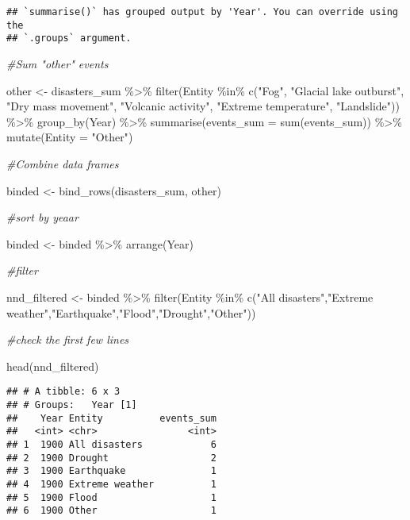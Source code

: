 \documentclass[
]{article}
\newenvironment{Shaded}{\begin{snugshade}}{\end{snugshade}}
\newcommand{\AttributeTok}[1]{\textcolor[rgb]{0.77,0.63,0.00}{#1}}
\newcommand{\CommentTok}[1]{\textcolor[rgb]{0.56,0.35,0.01}{\textit{#1}}}
\newcommand{\FunctionTok}[1]{\textcolor[rgb]{0.00,0.00,0.00}{#1}}
\newcommand{\NormalTok}[1]{#1}
\newcommand{\OtherTok}[1]{\textcolor[rgb]{0.56,0.35,0.01}{#1}}
\newcommand{\SpecialCharTok}[1]{\textcolor[rgb]{0.00,0.00,0.00}{#1}}
\newcommand{\StringTok}[1]{\textcolor[rgb]{0.31,0.60,0.02}{#1}}
\begin{document}
\begin{verbatim}
## `summarise()` has grouped output by 'Year'. You can override using the
## `.groups` argument.
\end{verbatim}

\begin{Shaded}
\begin{Highlighting}[]
\CommentTok{\#Sum "other" events }

\NormalTok{other }\OtherTok{\textless{}{-}}\NormalTok{ disasters\_sum }\SpecialCharTok{\%\textgreater{}\%}
  \FunctionTok{filter}\NormalTok{(Entity }\SpecialCharTok{\%in\%} \FunctionTok{c}\NormalTok{(}\StringTok{"Fog"}\NormalTok{, }\StringTok{"Glacial lake outburst"}\NormalTok{, }\StringTok{"Dry mass movement"}\NormalTok{, }\StringTok{"Volcanic activity"}\NormalTok{, }\StringTok{"Extreme temperature"}\NormalTok{, }\StringTok{"Landslide"}\NormalTok{)) }\SpecialCharTok{\%\textgreater{}\%} 
  \FunctionTok{group\_by}\NormalTok{(Year) }\SpecialCharTok{\%\textgreater{}\%}
  \FunctionTok{summarise}\NormalTok{(}\AttributeTok{events\_sum =} \FunctionTok{sum}\NormalTok{(events\_sum)) }\SpecialCharTok{\%\textgreater{}\%} 
  \FunctionTok{mutate}\NormalTok{(}\AttributeTok{Entity =} \StringTok{"Other"}\NormalTok{)}

\CommentTok{\#Combine data frames}

\NormalTok{binded }\OtherTok{\textless{}{-}} \FunctionTok{bind\_rows}\NormalTok{(disasters\_sum, other)}

\CommentTok{\#sort by yeaar}

\NormalTok{binded }\OtherTok{\textless{}{-}}\NormalTok{ binded }\SpecialCharTok{\%\textgreater{}\%} 
  \FunctionTok{arrange}\NormalTok{(Year)}

\CommentTok{\#filter}

\NormalTok{nnd\_filtered }\OtherTok{\textless{}{-}}\NormalTok{ binded }\SpecialCharTok{\%\textgreater{}\%} 
  \FunctionTok{filter}\NormalTok{(Entity }\SpecialCharTok{\%in\%} \FunctionTok{c}\NormalTok{(}\StringTok{"All disasters"}\NormalTok{,}\StringTok{"Extreme weather"}\NormalTok{,}\StringTok{"Earthquake"}\NormalTok{,}\StringTok{"Flood"}\NormalTok{,}\StringTok{"Drought"}\NormalTok{,}\StringTok{"Other"}\NormalTok{))}

\CommentTok{\#check the first few lines}

\FunctionTok{head}\NormalTok{(nnd\_filtered)}
\end{Highlighting}
\end{Shaded}

\begin{verbatim}
## # A tibble: 6 x 3
## # Groups:   Year [1]
##    Year Entity          events_sum
##   <int> <chr>                <int>
## 1  1900 All disasters            6
## 2  1900 Drought                  2
## 3  1900 Earthquake               1
## 4  1900 Extreme weather          1
## 5  1900 Flood                    1
## 6  1900 Other                    1
\end{verbatim}
\end{document}
